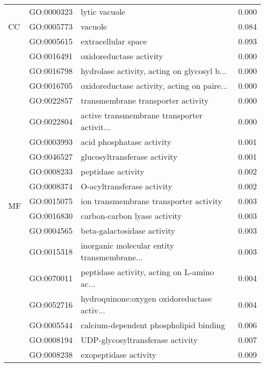 \begin{longtable}{lllr}
\cline{1-4}
\multirow{3}{*}{CC} & GO:0000323 &                                lytic vacuole &         0.000 \\
   & GO:0005773 &                                      vacuole &         0.084 \\
   & GO:0005615 &                          extracellular space &         0.093 \\
\cline{1-4}
\multirow{75}{*}{MF} & GO:0016491 &                      oxidoreductase activity &         0.000 \\
   & GO:0016798 &  hydrolase activity, acting on glycosyl b... &         0.000 \\
   & GO:0016705 &  oxidoreductase activity, acting on paire... &         0.000 \\
   & GO:0022857 &           transmembrane transporter activity &         0.000 \\
   & GO:0022804 &  active transmembrane transporter activit... &         0.000 \\
   & GO:0003993 &                    acid phosphatase activity &         0.001 \\
   & GO:0046527 &                 glucosyltransferase activity &         0.001 \\
   & GO:0008233 &                           peptidase activity &         0.002 \\
   & GO:0008374 &                   O-acyltransferase activity &         0.002 \\
   & GO:0015075 &       ion transmembrane transporter activity &         0.003 \\
   & GO:0016830 &                 carbon-carbon lyase activity &         0.003 \\
   & GO:0004565 &                  beta-galactosidase activity &         0.003 \\
   & GO:0015318 &  inorganic molecular entity transmembrane... &         0.003 \\
   & GO:0070011 &  peptidase activity, acting on L-amino ac... &         0.004 \\
   & GO:0052716 &  hydroquinone:oxygen oxidoreductase activ... &         0.004 \\
   & GO:0005544 &       calcium-dependent phospholipid binding &         0.006 \\
   & GO:0008194 &             UDP-glycosyltransferase activity &         0.007 \\
   & GO:0008238 &                        exopeptidase activity &         0.009 \\

\end{longtable}
